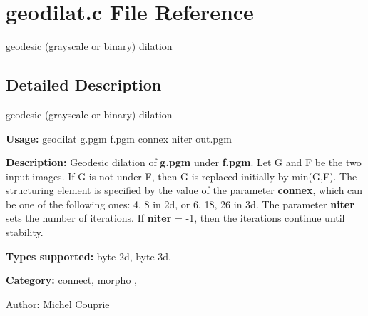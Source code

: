 \section{geodilat.c File Reference}
\label{geodilat_8c}
geodesic (grayscale or binary) dilation  




\label{_details}
\subsection{Detailed Description}
geodesic (grayscale or binary) dilation 

{\bf Usage:} geodilat g.pgm f.pgm connex niter out.pgm

{\bf Description:} Geodesic dilation of {\bf g.pgm} under {\bf f.pgm}. Let G and F be the two input images. If G is not under F, then G is replaced initially by min(G,F). The structuring element is specified by the value of the parameter {\bf connex}, which can be one of the following ones: 4, 8 in 2d, or 6, 18, 26 in 3d. The parameter {\bf niter} sets the number of iterations. If {\bf niter} = -1, then the iterations continue until stability.

{\bf Types supported:} byte 2d, byte 3d.

{\bf Category:} connect, morpho ,

\begin{Desc}
\item[Author:]Michel Couprie \end{Desc}
